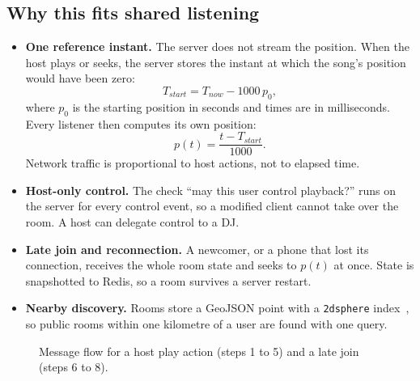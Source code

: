 \documentclass[11pt,a4paper]{article}
\begin{document}
\subsection{Why this fits shared listening}
\begin{itemize}
  \item \textbf{One reference instant.} The server does not stream the position. When the
        host plays or seeks, the server stores the instant at which the song's position
        would have been zero:
        \begin{equation}
          T_{start} = T_{now} - 1000\,p_0,
        \end{equation}
        where $p_0$ is the starting position in seconds and times are in milliseconds.
        Every listener then computes its own position:
        \begin{equation}
          p(t) = \frac{t - T_{start}}{1000}.
        \end{equation}
        Network traffic is proportional to host actions, not to elapsed time.
  \item \textbf{Host-only control.} The check ``may this user control playback?'' runs on
        the server for every control event, so a modified client cannot take over the room.
        A host can delegate control to a DJ.
  \item \textbf{Late join and reconnection.} A newcomer, or a phone that lost its
        connection, receives the whole room state and seeks to $p(t)$ at once. State is
        snapshotted to Redis, so a room survives a server restart.
  \item \textbf{Nearby discovery.} Rooms store a GeoJSON point with a \texttt{2dsphere}
        index~\cite{mongo}, so public rooms within one kilometre of a user are found with one query.
\end{itemize}

\begin{figure}[htbp]
\centering
{}
\caption{Message flow for a host play action (steps 1 to 5) and a late join (steps 6 to 8).}
\label{fig:sequence}
\end{figure}
\end{document}
